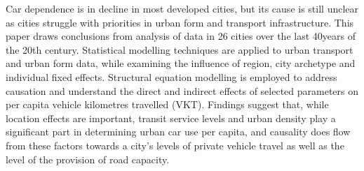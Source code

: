Car dependence is in decline in most developed cities, but its cause is still unclear as cities struggle with priorities in urban form and transport infrastructure. This paper draws conclusions from analysis of data in 26 cities over the last 40years of the 20th century. Statistical modelling techniques are applied to urban transport and urban form data, while examining the influence of region, city archetype and individual fixed effects. Structural equation modelling is employed to address causation and understand the direct and indirect effects of selected parameters on per capita vehicle kilometres travelled (VKT). Findings suggest that, while location effects are important, transit service levels and urban density play a significant part in determining urban car use per capita, and causality does flow from these factors towards a city’s levels of private vehicle travel as well as the level of the provision of road capacity.